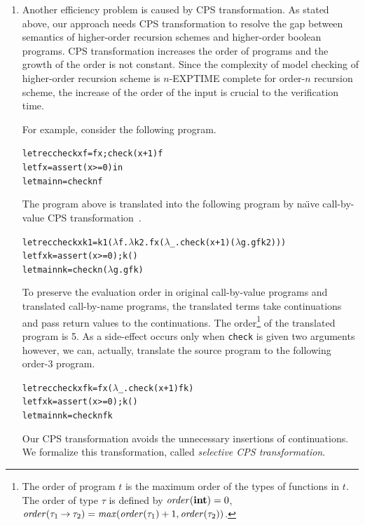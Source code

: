 \begin{enumerate}
\item Another efficiency problem is caused by CPS transformation.  As
      stated above, our approach needs CPS transformation to resolve the
      gap between semantics of higher-order recursion schemes and
      higher-order boolean programs.  CPS transformation increases the
      order of programs and the growth of the order is not constant.
      Since the complexity of model checking of higher-order recursion
      scheme is $n$-EXPTIME complete for order-$n$ recursion scheme, the
      increase of the order of the input is crucial to the verification
      time.

      For example, consider the following program.
\begin{alltt}
let rec check x f = f x; check (x+1) f
let f x = assert (x >= 0) in
let main n = check n f
\end{alltt}
      The program above is translated into the following program by
      na\"{\i}ve call-by-value CPS transformation~\cite{Plotkin1975}.
\begin{alltt}
let rec check x k1 = k1 (\(\lambda\)f.\(\lambda\)k2.f x (\(\lambda\)_.check (x+1) (\(\lambda\)g.g f k2)))
let f x k = assert (x >= 0); k ()
let main n k = check n (\(\lambda\)g. g f k)
\end{alltt}
      To preserve the evaluation order in original call-by-value programs
      and translated call-by-name programs, the translated terms take
      continuations and pass return values to the continuations.  The
      order\footnote{The order of program $t$ is the maximum order of
      the types of functions in $t$.  The order of type $\tau$ is
      defined by $\mathit{order}(\mathbf{int})=0$,
      $\mathit{order}({\tau_1}\mathbin{\rightarrow}{\tau_2}) =
      \mathit{max}(\mathit{order}(\tau_1)+1, \mathit{order}(\tau_2))$.}
      of the translated program is 5.
      As a side-effect occurs only when \texttt{check} is given two arguments however,
      we can, actually, translate the source program to the following order-3 program.
\begin{alltt}
let rec check x f k = f x (\(\lambda\)_.check (x+1) f k)
let f x k = assert (x >= 0); k ()
let main n k = check n f k
\end{alltt}
      Our CPS transformation avoids the unnecessary insertions of
      continuations.  We formalize this transformation, called
      \emph{selective CPS transformation}.


\end{enumerate}
